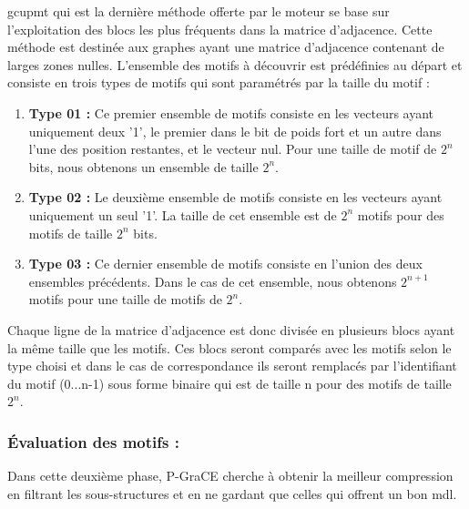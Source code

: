 \documentclass[a4paper,oneside,12pt]{report}
\theoremstyle{definition}
\begin{document}
\begin{enumerate}
\gls{gcupmt} qui est la dernière méthode offerte par le moteur se base sur l'exploitation des blocs les plus fréquents dans la matrice d'adjacence.  Cette méthode est destinée aux graphes ayant une matrice d'adjacence contenant de larges zones nulles. L'ensemble des motifs à découvrir est prédéfinies au départ et consiste en trois types de motifs qui sont paramétrés par la taille du motif :

	\begin{enumerate}[label=(\alph*)]
		\item \textbf{Type 01 :} Ce premier ensemble de motifs consiste en les vecteurs ayant uniquement deux '1', le premier dans le bit de poids fort et un autre dans l'une des position restantes, et le vecteur nul. Pour une taille de motif de $2^n$ bits, nous obtenons un ensemble de taille $2^n$.
		
		
		
		\item \textbf{Type 02 :} Le deuxième ensemble de motifs consiste en les vecteurs ayant uniquement un seul '1'. La taille de cet ensemble est de $2^n$ motifs pour des motifs de taille $2^n$ bits.
		\item \textbf{Type 03 :}  Ce dernier ensemble de motifs consiste en l'union des deux ensembles précédents. Dans le cas de cet ensemble, nous obtenons $2^{n+1}$ motifs pour une taille de motifs de $2^n$.
	\end{enumerate}	

Chaque ligne de la matrice d'adjacence est donc divisée en plusieurs blocs ayant la même taille que les motifs. Ces blocs seront comparés avec les motifs selon le type choisi et dans le cas de correspondance ils seront remplacés par l'identifiant du motif (0...n-1) sous forme binaire qui est de taille n pour des motifs de taille $2^n$.


	
\end{enumerate}
		
		\subsubsection{Évaluation des motifs :}
		
		 Dans cette deuxième phase, P-GraCE cherche à obtenir la meilleur compression en filtrant les sous-structures et en ne gardant que celles qui offrent un bon \gls{mdl}. 
		 
\end{document}

